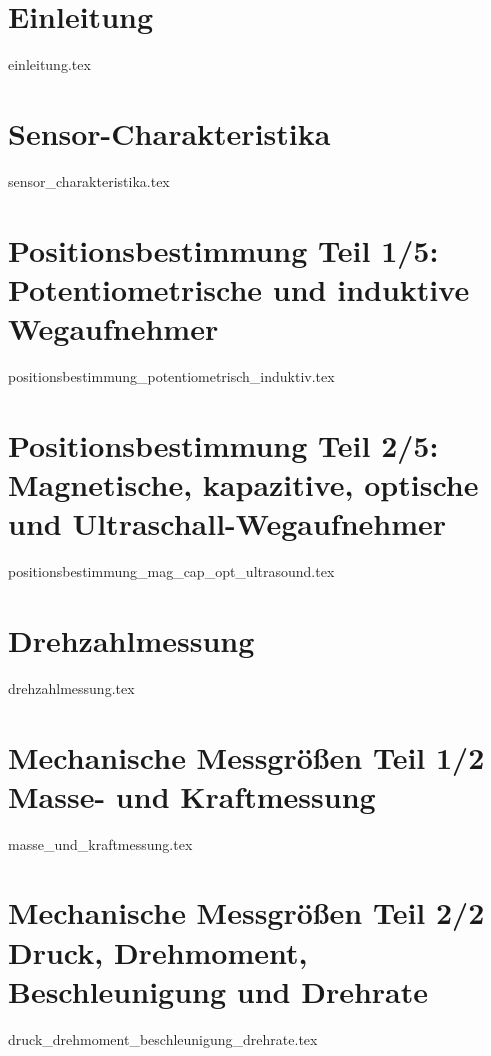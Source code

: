 \part{Einleitung}
{einleitung.tex}

\part{Sensor-Charakteristika}
{sensor_charakteristika.tex}

\part{Positionsbestimmung Teil 1/5:\\Potentiometrische und induktive Wegaufnehmer}
{positionsbestimmung_potentiometrisch_induktiv.tex}

\part{Positionsbestimmung Teil 2/5:\\Magnetische, kapazitive, optische und Ultraschall-Wegaufnehmer}
{positionsbestimmung_mag_cap_opt_ultrasound.tex}


\part{Drehzahlmessung}
{drehzahlmessung.tex}

\part{Mechanische Messgrößen Teil 1/2\\Masse- und Kraftmessung}
{masse_und_kraftmessung.tex}

\part{Mechanische Messgrößen Teil 2/2\\Druck, Drehmoment, Beschleunigung und Drehrate}
{druck_drehmoment_beschleunigung_drehrate.tex}

